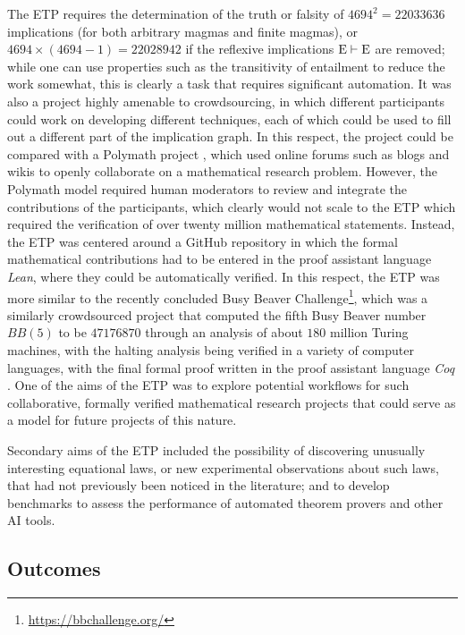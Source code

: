 The ETP requires the determination of the truth or falsity of $\num{4694}^2 = \num{22033636}$ implications (for both arbitrary magmas and finite magmas), or $\num{4694} \times (\num{4694}-1) = \num{22028942}$ if the reflexive implications ${\mathrm{E}} \vdash \mathrm{E}$ are removed; while one can use properties such as the transitivity of entailment to reduce the work somewhat, this is clearly a task that requires significant automation. It was also a project highly amenable to crowdsourcing, in which different participants could work on developing different techniques, each of which could be used to fill out a different part of the implication graph. In this respect, the project could be compared with a Polymath project \cite{Gowers2009}, which used online forums such as blogs and wikis to openly collaborate on a mathematical research problem. However, the Polymath model required human moderators to review and integrate the contributions of the participants, which clearly would not scale to the ETP which required the verification of over twenty million mathematical statements. Instead, the ETP was centered around a GitHub repository in which the formal mathematical contributions had to be entered in the proof assistant language \emph{Lean}, where they could be automatically verified. In this respect, the ETP was more similar to the recently concluded Busy Beaver Challenge\footnote{\url{https://bbchallenge.org/}}, which was a similarly crowdsourced project that computed the fifth Busy Beaver number $BB(5)$ to be $\num{47176870}$ through an analysis of about $180$ million Turing machines, with the halting analysis being verified in a variety of computer languages, with the final formal proof written in the proof assistant language \emph{Coq} \cite{the_coq_development_team_2024_14542673, bbchallenge_bb5}. One of the aims of the ETP was to explore potential workflows for such collaborative, formally verified mathematical research projects that could serve as a model for future projects of this nature.

Secondary aims of the ETP included the possibility of discovering unusually interesting equational laws, or new experimental observations about such laws, that had not previously been noticed in the literature; and to develop benchmarks to assess the performance of automated theorem provers and other AI tools.

\subsection{Outcomes}

